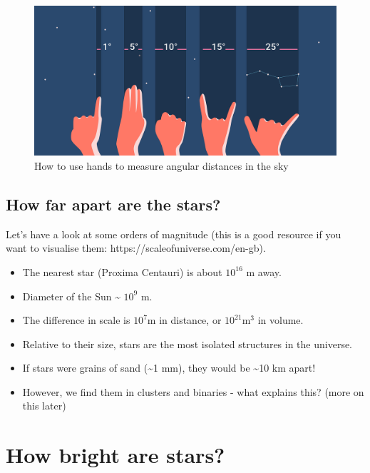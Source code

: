 \documentclass[
  letterpaper,
  DIV=11,
  numbers=noendperiod]{scrreprt}
\providecommand{\tightlist}{%
  \setlength{\itemsep}{0pt}\setlength{\parskip}{0pt}}\usepackage{longtable,booktabs,array}
\begin{document}
\begin{figure}

{\centering \includegraphics{img/measuring-sky-with-hand.png}

}

\caption{How to use hands to measure angular distances in the sky}

\end{figure}

\hypertarget{how-far-apart-are-the-stars}{%
\section{How far apart are the
stars?}\label{how-far-apart-are-the-stars}}

Let's have a look at some orders of magnitude (this is a good resource
if you want to visualise them: https://scaleofuniverse.com/en-gb).

\begin{itemize}
\tightlist
\item
  The nearest star (Proxima Centauri) is about \(10^{16}\) m away.
\item
  Diameter of the Sun \textasciitilde{} \(10^{9}\) m.
\item
  The difference in scale is \(10^7\)m in distance, or
  \(10^{21}\)m\(^3\) in volume.
\item
  Relative to their size, stars are the most isolated structures in the
  universe.
\item
  If stars were grains of sand (\textasciitilde1 mm), they would be
  \textasciitilde10 km apart!
\item
  However, we find them in clusters and binaries - what explains this?
  (more on this later)
\end{itemize}


\hypertarget{how-bright-are-stars}{%
\chapter{How bright are stars?}\label{how-bright-are-stars}}
\end{document}
